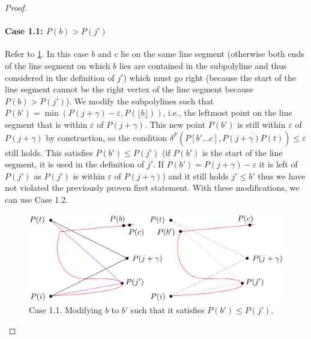 \begin{proof}
	\paragraph{Case 1.1: \(P(b) > P(j')\)} 
	Refer to \cref{fig:case11}. In this case \(b\) and \(c\) lie on the same line segment (otherwise both ends of the line segment on which \(b\) lies are contained in the subpolyline and thus considered in the definition of \(j'\)) which must go right (because the start of the line segment cannot be the right vertex of the line segment because \(P(b) > P(j')\)). We modify the subpolylines such that \(P(b') = \min(P(j+\gamma) - \varepsilon, P(\lfloor b \rfloor))\), i.e., the leftmost point on the line segment that is within \(\varepsilon\) of \(P(j+\gamma)\). This new point \(P(b')\) is still within \(\varepsilon\) of \(P(j+\gamma)\) by construction, so the condition \(\delta^F(P[b' \dots c], \overline{P(j+\gamma)P(t)}) \leq \varepsilon\) still holds. This satisfies \(P(b') \leq P(j')\) (if \(P(b')\) is the start of the line segment, it is used in the definition of \(j'\). If \(P(b') = P(j+\gamma)-\varepsilon\) it is left of \(P(j')\) as \(P(j')\) is within \(\varepsilon\) of \(P(j+\gamma)\)) and it still holds \(j' \leq b'\) thus we have not violated the previously proven first statement. With these modifications, we can use Case 1.2.

	\begin{figure}[b]
		\centering
		\includegraphics[scale=0.15]{./figures/case1-1.png}
		\caption{Case 1.1. Modifying \(b\) to \(b'\) such that it satisfies \(P(b') \leq P(j')\).}
		\label{fig:case11}
	\end{figure}


\end{proof}
